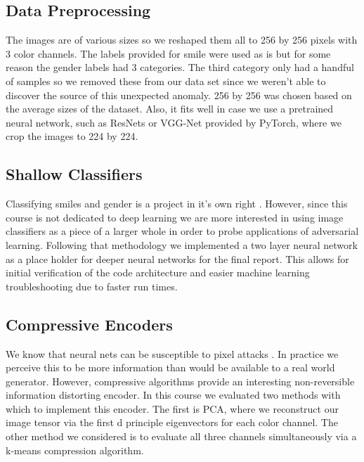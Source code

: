 \documentclass[10pt,twocolumn,letterpaper]{article}
\begin{document}
\subsection{Data Preprocessing}
The images are of various sizes so we reshaped them all to 256 by 256 pixels with 3 color channels. The labels provided for smile were used as is but for some reason the gender labels had 3 categories. The third category only had a handful of samples so we removed these from our data set since we weren't able to discover the source of this unexpected anomaly. 256 by 256 was chosen based on the average sizes of the dataset. Also, it fits well in case we use a pretrained neural network, such as ResNets or VGG-Net provided by PyTorch, where we crop the images to 224 by 224.

\subsection{Shallow Classifiers}
Classifying smiles and gender is a project in it's own right \cite{CNN}. However, since this course is not dedicated to deep learning we are more interested in using image classifiers as a piece of a larger whole in order to probe applications of adversarial learning. Following that methodology we implemented a two layer neural network as a place holder for deeper neural networks for the final report. This allows for initial verification of the code architecture and easier machine learning troubleshooting due to faster run times.

\subsection{Compressive Encoders}
We know that neural nets can be susceptible to pixel attacks \cite{PixelAttack}. In practice we perceive this to be more information than would be available to a real world generator. However, compressive algorithms provide an interesting non-reversible information distorting encoder. In this course we evaluated two methods with which to implement this encoder. The first is PCA, where we reconstruct our image tensor via the first d principle eigenvectors for each color channel. The other method we considered is to evaluate all three channels simultaneously via a k-means compression algorithm.

\end{document}
